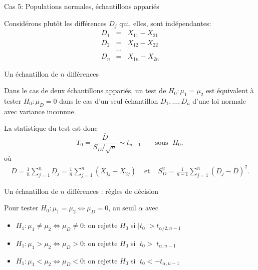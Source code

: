 \documentclass{BeamerTemplate}
\begin{document}
\begin{frame}[t]{Cas 5: Populations normales, échantillons appariés}

Considérons plutôt les différences $D_j$ qui, elles, \alert{sont indépendantes}:
 $$\begin{array}{lll}
 D_1 &=& X_{11}-X_{21}\\
 D_2 &=& X_{12}-X_{22}\\
 &...&\\
 D_n &=& X_{1n} - X_{2n}
 \end{array}$$


\medskip


\end{frame}

\begin{frame}[t]{Un échantillon de $n$ différences}

{\small

Dans le cas de deux échantillons appariés, un test de $H_0: \mu_1 = \mu_2$ est équivalent à tester $H_0: \mu_D = 0$ dans le cas d'\alert{un seul échantillon $D_1,\ldots,D_n$
d'une loi normale avec variance inconnue}.

\bigskip
La statistique du test est donc
$$
T_0 = \frac{\overline{D}}{S_D / \sqrt{n}}\sim t_{n-1}\qquad\text{sous }\;H_0,
$$
o\`u
\begin{align*}
\overline{D} = \frac{1}{n} \sum_{j=1}^n D_j = \frac{1}{n} \sum_{j=1}^n (X_{1j} - X_{2j}) & \mbox{ et } & S_D^2 = \frac{1}{n-1} \sum_{j=1}^n (D_j - \overline{D})^2.
\end{align*}

\medskip
{}
}
\end{frame}

\begin{frame}[t]{Un échantillon de $n$ différences : règles de décision}

Pour tester $H_0:\mu_1=\mu_2\Leftrightarrow\mu_D=0$, au seuil $\alpha$ avec
\begin{itemize}\itemsep2mm
\item $H_1 : \mu_1 \ne \mu_2\Leftrightarrow \mu_D\neq 0$: on rejette $H_0$ si $|t_0| > t_{\alpha/2, n-1}$
\item $H_1 : \mu_1 > \mu_2\Leftrightarrow \mu_D> 0$: on rejette $H_0$ si $\;t_0   > \;t_{\alpha,n-1}$
\item $H_1 : \mu_1 < \mu_2\Leftrightarrow \mu_D< 0$: on rejette $H_0$ si $\;t_0   < - t_{\alpha,n-1}$
\end{itemize}
\end{frame}
\end{document}
